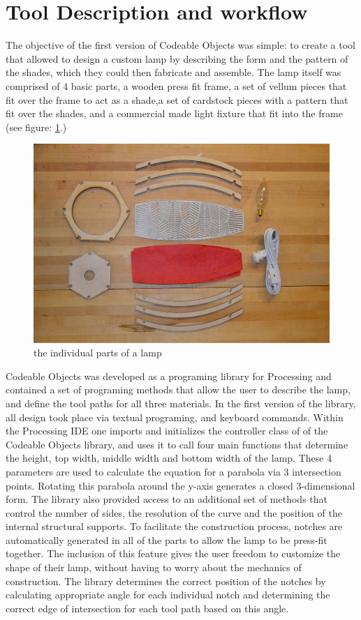 \section{Tool Description and workflow}
The objective of the first version of Codeable Objects was simple: to create a tool that allowed to design a custom lamp by describing the form and the pattern of the shades, which they could then fabricate and assemble. The lamp itself was comprised of 4 basic parts, a wooden press fit frame, a set of vellum pieces that fit over the frame to act as a shade,a set of cardstock pieces with a pattern that fit over the shades, and a commercial made light fixture that fit into the frame (see figure: \ref{fig:lamp_parts}.)
\begin{center}
\begin{figure}[h!]
\includegraphics[width=6.5in]{images/parts.png}
\caption{the individual parts of a lamp}
\label{fig:lamp_parts}
\end{figure}
\end{center}
Codeable Objects was developed as a programing library for Processing and contained a set of programing methods that allow the user to describe the lamp, and define the tool paths for all three materials. In the first version of the library, all design took place via textual programing, and keyboard commands.  Within the Processing IDE one imports and initializes the controller class of of the Codeable Objects library, and uses it to call four main functions that determine the height, top width, middle width and bottom width of the lamp. These 4 parameters are used to calculate the equation for a parabola via 3 intersection points. Rotating this parabola around the y-axis generates a closed 3-dimensional form.  The library also provided access to an additional set of methods that control the number of sides, the resolution of the curve and the position of the internal structural supports. To facilitate the construction process, notches are automatically generated in all of the parts to allow the lamp to be press-fit together. The inclusion of this feature gives the user freedom to customize the shape of their lamp, without having to worry about the mechanics of construction. The library determines the correct position of the notches by calculating appropriate angle for each individual notch and determining the correct edge of intersection for each tool path based on this angle.  

